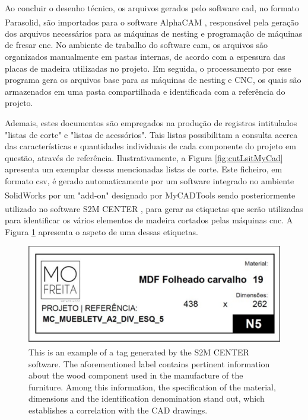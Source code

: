 Ao concluir o desenho técnico, os arquivos gerados pelo software \acrshort{cad}, no formato Parasolid, são importados para o software AlphaCAM\textsuperscript{\textregistered} \cite{alphacam}, responsável pela geração dos arquivos necessários para as máquinas de nesting e programação de máquinas de fresar \acrfull{cnc}. No ambiente de trabalho do software \acrfull{cam}, os arquivos são organizados manualmente em pastas internas, de acordo com a espessura das placas de madeira utilizadas no projeto. Em seguida, o processamento por esse programa gera os arquivos base para as máquinas de nesting e CNC, os quais são armazenados em uma pasta compartilhada e identificada com a referência do projeto.

Ademais, estes documentos são empregados na produção de registros intitulados "listas de corte" e "listas de acessórios". Tais listas possibilitam a consulta acerca das características e quantidades individuais de cada componente do projeto em questão, através de referência. Ilustrativamente, a Figura \ref{fig:cutLsitMyCad} apresenta um exemplar dessas mencionadas listas de corte. Este ficheiro, em formato \acrfull{csv}, é gerado automaticamente por um software integrado no ambiente SolidWorks\textsuperscript{\textregistered} por um "add-on" designado por MyCADTools\textsuperscript{\textregistered} \cite{mycadtools} sendo posteriormente utilizado no software S2M CENTER\textsuperscript{\textregistered} \cite{s2mcenter}, para gerar as etiquetas que serão utilizadas para identificar os vários elementos de madeira cortados pelas máquinas \acrshort{cnc}. A Figura \ref{fig:tagExample} apresenta o aspeto de uma dessas etiquetas.


\begin{figure}[h!]
    \centering
    \includegraphics[width=.65\linewidth]{images/Development/chap4/tagExample.png} 
    \caption{This is an example of a tag generated by the S2M CENTER\textsuperscript{\textregistered} software. The aforementioned label contains pertinent information about the wood component used in the manufacture of the furniture. Among this information, the specification of the material, dimensions and the identification denomination stand out, which establishes a correlation with the CAD drawings.}
    \label{fig:tagExample}
\end{figure}

